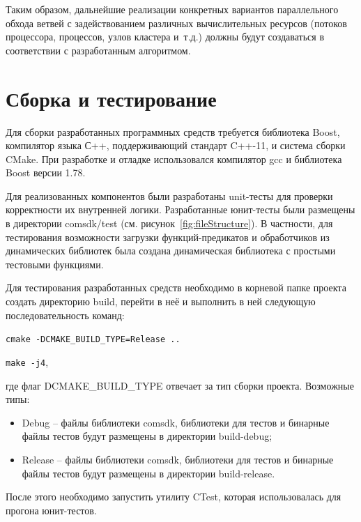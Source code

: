 Таким образом, дальнейшие реализации конкретных вариантов параллельного обхода ветвей с задействованием различных вычислительных ресурсов (потоков процессора, процессов, узлов кластера и~т.д.) должны будут создаваться в соответствии с разработанным алгоритмом.

\section{Сборка и тестирование}
Для сборки разработанных программных средств требуется библиотека Boost, компилятор языка С++, поддерживающий стандарт C++-11, и система сборки CMake. При разработке и отладке использовался компилятор gcc и библиотека Boost версии 1.78.

Для реализованных компонентов были разработаны unit-тесты для проверки корректности их внутренней логики. Разработанные юнит-тесты были размещены в директории comsdk/test (см. рисунок~\ref{fig:fileStructure}). В частности, для тестирования возможности загрузки функций-предикатов и обработчиков из динамических библиотек была создана динамическая библиотека с простыми тестовыми функциями.


Для тестирования разработанных средств необходимо в корневой папке проекта создать директорию build, перейти в неё и выполнить в ней следующую последовательность команд:

\texttt{cmake -DCMAKE_BUILD_TYPE=Release ..}

\texttt{make -j4},

где флаг \textsf{DCMAKE_BUILD_TYPE} отвечает за тип сборки проекта. Возможные типы:
\begin{itemize}
    \item Debug -- файлы библиотеки comsdk, библиотеки для тестов и бинарные файлы тестов будут размещены в директории build-debug;
    \item Release -- файлы библиотеки comsdk, библиотеки для тестов и бинарные файлы тестов будут размещены в директории build-release.
\end{itemize}

После этого необходимо запустить утилиту CTest, которая использовалась для прогона юнит-тестов.